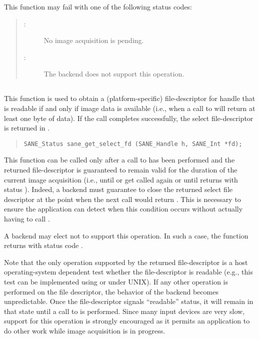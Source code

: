 \documentclass[11pt,DVIps]{report}
\begin{document}
This function may fail with one of the following status codes:
\begin{quote}
\begin{description}
\item[:] No image acquisition is pending.
\item[:] The backend does not support
  this operation.
\end{description}
\end{quote}


\subsection{}

This function is used to obtain a (platform-specific) file-descriptor
for handle  that is readable if and only if image data is
available (i.e., when a call to  will return at
least one byte of data).  If the call completes successfully, the
select file-descriptor is returned in .
\begin{quote}
\begin{verbatim}
SANE_Status sane_get_select_fd (SANE_Handle h, SANE_Int *fd);
\end{verbatim}
\end{quote}
This function can be called only after a call to 
has been performed and the returned file-descriptor is guaranteed to
remain valid for the duration of the current image acquisition (i.e.,
until  or  get called again
or until  returns with status
).  Indeed, a backend must guarantee to
close the returned select file descriptor at the point when the next
 call would return .
This is necessary to ensure the application can detect when this
condition occurs without actually having to call .

A backend may elect not to support this operation.  In such a case,
the function returns with status code
.

Note that the only operation supported by the returned file-descriptor
is a host operating-system dependent test whether the file-descriptor
is readable (e.g., this test can be implemented using 
or  under UNIX).  If any other operation is performed on
the file descriptor, the behavior of the backend becomes
unpredictable.  Once the file-descriptor signals ``readable'' status,
it will remain in that state until a call to  is
performed.  Since many input devices are very slow, support for this
operation is strongly encouraged as it permits an application to do
other work while image acquisition is in progress.
\end{document}
